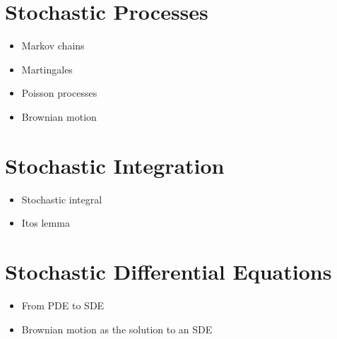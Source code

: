 \section{Stochastic Processes}
\begin{itemize}
    \item Markov chains
    \item Martingales
    \item Poisson processes
    \item Brownian motion
\end{itemize}

\section{Stochastic Integration}
\begin{itemize}
    \item Stochastic integral
    \item Itos lemma
\end{itemize}

\section{Stochastic Differential Equations}
\begin{itemize}
    \item From PDE to SDE
    \item Brownian motion as the solution to an SDE
\end{itemize}
